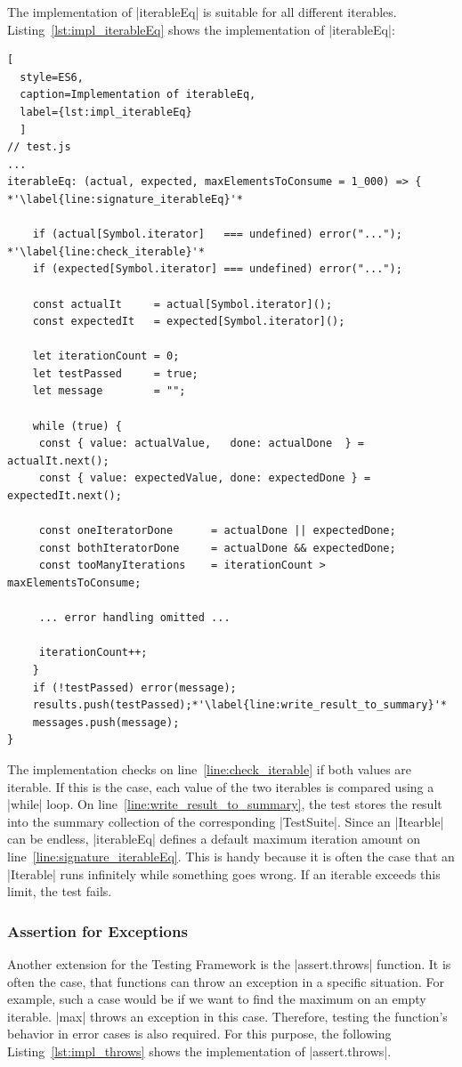 The implementation of |iterableEq| is suitable for all different iterables.
Listing~\ref{lst:impl_iterableEq} shows the implementation of |iterableEq|:

\begin{lstlisting}[
  style=ES6, 
  caption=Implementation of iterableEq,
  label={lst:impl_iterableEq}
  ]
// test.js
...
iterableEq: (actual, expected, maxElementsToConsume = 1_000) => { *'\label{line:signature_iterableEq}'*

    if (actual[Symbol.iterator]   === undefined) error("..."); *'\label{line:check_iterable}'*
    if (expected[Symbol.iterator] === undefined) error("...");

    const actualIt     = actual[Symbol.iterator]();
    const expectedIt   = expected[Symbol.iterator]();

    let iterationCount = 0;
    let testPassed     = true;
    let message        = "";

    while (true) {
     const { value: actualValue,   done: actualDone  } = actualIt.next();
     const { value: expectedValue, done: expectedDone } = expectedIt.next();

     const oneIteratorDone      = actualDone || expectedDone;
     const bothIteratorDone     = actualDone && expectedDone;
     const tooManyIterations    = iterationCount > maxElementsToConsume;

     ... error handling omitted ...

     iterationCount++;
    }
    if (!testPassed) error(message);
    results.push(testPassed);*'\label{line:write_result_to_summary}'*
    messages.push(message);
}
\end{lstlisting}

The implementation checks on line~\ref{line:check_iterable} if both values are
iterable. If this is the case, each value of the two iterables is compared
using a |while| loop. On line~\ref{line:write_result_to_summary}, the
test stores the result into the summary collection of the corresponding |TestSuite|.
\newline
Since an |Itearble| can be endless, |iterableEq| defines a default maximum
iteration amount on line~\ref{line:signature_iterableEq}.  This is handy
because it is often the case that an |Iterable| runs infinitely while something
goes wrong. If an iterable exceeds this limit, the test fails.

\subsubsection{Assertion for Exceptions}
\label{subsub:Assertion for Exceptions}
Another extension for the Testing Framework is the |assert.throws| function.
It is often the case, that functions can throw an exception in a specific situation.
For example, such a case would be if we want to find the maximum on an empty
iterable. |max| throws an exception in this case. Therefore, testing the
function's behavior in error cases is also required. For this purpose, the
following Listing~\ref{lst:impl_throws} shows the implementation of |assert.throws|.

